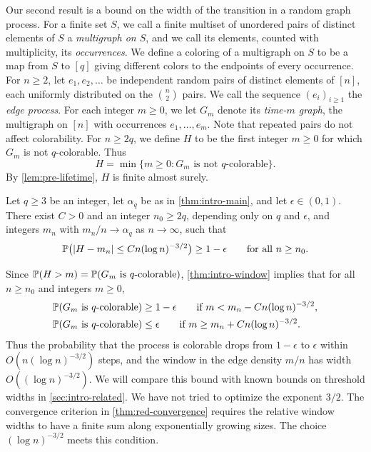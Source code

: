 Our second result is a bound on the width of the transition in a random graph process. For a finite set $S$, we call a finite multiset of unordered pairs of distinct elements of $S$ a \emph{multigraph on $S$}, and we call its elements, counted with multiplicity, its \emph{occurrences}. We define a coloring of a multigraph on $S$ to be a map from $S$ to $[q]$ giving different colors to the endpoints of every occurrence. For $n \ge 2$, let $e_1, e_2, \dots$ be independent random pairs of distinct elements of $[n]$, each uniformly distributed on the $\binom{n}{2}$ pairs. We call the sequence $(e_i)_{i \ge 1}$ the \emph{edge process}. For each integer $m \ge 0$, we let $G_m$ denote its \emph{time-$m$ graph}, the multigraph on $[n]$ with occurrences $e_1, \dots, e_m$. Note that repeated pairs do not affect colorability. For $n \ge 2q$, we define $H$ to be the first integer $m \ge 0$ for which $G_m$ is not $q$-colorable. Thus
\[
H = \min\{m \ge 0 : G_m \text{ is not $q$-colorable}\}.
\]
By \cref{lem:pre-lifetime}, $H$ is finite almost surely.

\begin{theorem}\label{thm:intro-window}
Let $q \ge 3$ be an integer, let $\alpha_q$ be as in \cref{thm:intro-main}, and let $\epsilon \in (0, 1)$. There exist $C > 0$ and an integer $n_0 \ge 2q$, depending only on $q$ and $\epsilon$, and integers $m_n$ with $m_n/n \to \alpha_q$ as $n \to \infty$, such that
\begin{equation}\label{eq:intro-window}
\mathbb P\bigl(\left|H - m_n\right| \le C n (\log n)^{-3/2}\bigr) \ge 1 - \epsilon \qquad \text{for all } n \ge n_0.
\end{equation}
\end{theorem}

Since $\mathbb P(H > m) = \mathbb P(G_m \text{ is $q$-colorable})$, \cref{thm:intro-window} implies that for all $n \ge n_0$ and integers $m \ge 0$,
\[
\begin{aligned}
\mathbb P(G_m \text{ is $q$-colorable}) &\ge 1 - \epsilon \qquad \text{if } m < m_n - C n (\log n)^{-3/2}, \\
\mathbb P(G_m \text{ is $q$-colorable}) &\le \epsilon \qquad \text{if } m \ge m_n + C n (\log n)^{-3/2}.
\end{aligned}
\]
Thus the probability that the process is colorable drops from $1 - \epsilon$ to $\epsilon$ within $O(n (\log n)^{-3/2})$ steps, and the window in the edge density $m/n$ has width $O((\log n)^{-3/2})$. We will compare this bound with known bounds on threshold widths in \cref{sec:intro-related}. We have not tried to optimize the exponent $3/2$. The convergence criterion in \cref{thm:red-convergence} requires the relative window widths to have a finite sum along exponentially growing sizes. The choice $(\log n)^{-3/2}$ meets this condition.

